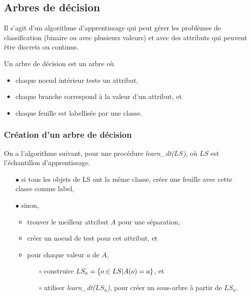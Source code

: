 
		
		
		
\subsection{Arbres de décision}

Il s'agit d'un algorithme d'apprentissage qui peut gérer les problèmes de classification (binaire ou avec plusieurs valeurs) et avec des attributs qui peuvent être discrets ou continus.

Un arbre de décision est un arbre où

\begin{itemize}
	\item chaque noeud intérieur teste un attribut,
	\item chaque branche correspond à la valeur d'un attribut, et
	\item chaque feuille est labellisée par une classe.
\end{itemize}


	\subsubsection{Création d'un arbre de décision}
	
	On a l'algorithme suivant, pour une procédure \textit{learn\_dt($LS$)}, où $LS$ est l'échantillon d'apprentissage.
	
	\begin{itemize}
		\item[$\bullet$] si tous les objets de LS ont la même classe, créer une feuille avec cette classe comme label,
		\item[$\bullet$] sinon,
		\begin{itemize}
			\item trouver le meilleur attribut $A$ pour une séparation,
			\item créer un noeud de test pour cet attribut, et
			\item pour chaque valeur $a$ de $A$,
			\begin{itemize}
				\item[$\circ$] construire $LS_a = \lbrace o \in LS \vert A(o) = a \rbrace$, et
				\item[$\circ$] utiliser \textit{learn\_dt($LS_a$)}, pour créer un sous-arbre à partir de $LS_a$.
			\end{itemize}
		\end{itemize}
	\end{itemize}
	
